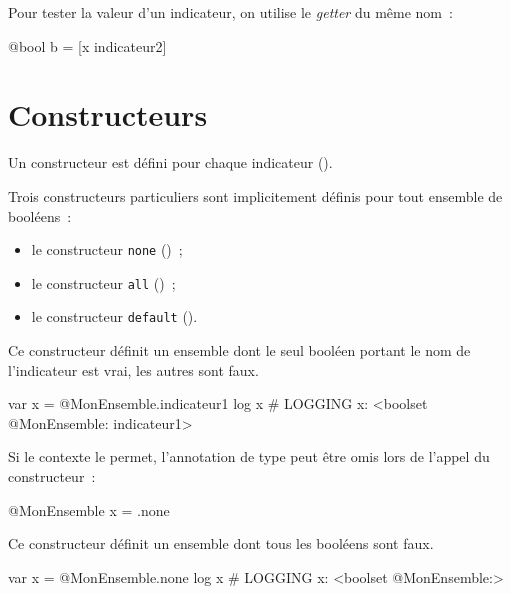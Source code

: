 Pour tester la valeur d'un indicateur, on utilise le \emph{getter} du même nom~:
\begin{galgas}
@bool b = [x indicateur2]
\end{galgas}










\section{Constructeurs}

Un constructeur est défini pour chaque indicateur ().

Trois constructeurs particuliers sont implicitement définis pour tout ensemble de booléens~:
\begin{itemize}
  \item le constructeur \texttt{none} ()~;
  \item le constructeur \texttt{all} ()~;
  \item le constructeur \texttt{default} ().
\end{itemize}


Ce constructeur définit un ensemble dont le seul booléen portant le nom de l'indicateur est vrai, les autres sont faux.

\begin{galgas}
var x = @MonEnsemble.indicateur1
log x # LOGGING x: <boolset @MonEnsemble: indicateur1>
\end{galgas}

Si le contexte le permet, l'annotation de type peut être omis lors de l'appel du constructeur~:
\begin{galgas}
@MonEnsemble x = .none
\end{galgas}



Ce constructeur définit un ensemble dont tous les booléens sont faux.

\begin{galgas}
var x = @MonEnsemble.none
log x # LOGGING x: <boolset @MonEnsemble:>
\end{galgas}

